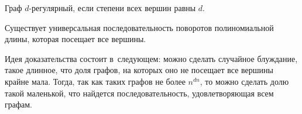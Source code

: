 \documentclass{article}
\begin{document}
\begin{definition}
	Граф $d$-регулярный, если степени всех вершин равны $d$.
\end{definition}

\begin{claim}
Существует универсальная последовательность поворотов полиномиальной длины,
которая посещает все вершины.
\end{claim}

Идея доказательства состоит в~следующем: можно сделать случайное блуждание,
такое длинное, что доля графов, на которых оно не посещает все вершины крайне
мала. Тогда, так как таких графов не более $n^{dn}$, то можно сделать долю такой
маленькой, что найдется последовательность, удовлетворяющая всем графам.
\end{document}
